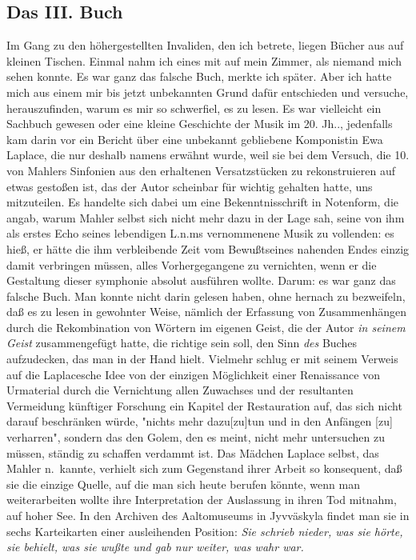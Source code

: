 \documentclass[
]{article}
\author{}
\date{\vspace{-2.5em}}
\begin{document}
\subsection{Das III. Buch}\label{das-iii.-buch}

Im Gang zu den höhergestellten Invaliden, den ich betrete, liegen Bücher
aus auf kleinen Tischen. Einmal nahm ich eines mit auf mein Zimmer, als
niemand mich sehen konnte. Es war ganz das falsche Buch, merkte ich
später. Aber ich hatte mich aus einem mir bis jetzt unbekannten Grund
dafür entschieden und versuche, herauszufinden, warum es mir so
schwerfiel, es zu lesen. Es war vielleicht ein Sachbuch gewesen oder
eine kleine Geschichte der Musik im 20. Jh.., jedenfalls kam darin vor
ein Bericht über eine unbekannt gebliebene Komponistin Ewa Laplace, die
nur deshalb namens erwähnt wurde, weil sie bei dem Versuch, die 10. von
Mahlers Sinfonien aus den erhaltenen Versatzstücken zu rekonstruieren
auf etwas gestoßen ist, das der Autor scheinbar für wichtig gehalten
hatte, uns mitzuteilen. Es handelte sich dabei um eine Bekenntnisschrift
in Notenform, die angab, warum Mahler selbst sich nicht mehr dazu in der
Lage sah, seine von ihm als erstes Echo seines lebendigen L.n.ms
vernommenene Musik zu vollenden: es hieß, er hätte die ihm verbleibende
Zeit vom Bewußtseines nahenden Endes einzig damit verbringen müssen,
alles Vorhergegangene zu vernichten, wenn er die Gestaltung dieser
symphonie absolut ausführen wollte. Darum: es war ganz das falsche Buch.
Man konnte nicht darin gelesen haben, ohne hernach zu bezweifeln, daß es
zu lesen in gewohnter Weise, nämlich der Erfassung von Zusammenhängen
durch die Rekombination von Wörtern im eigenen Geist, die der Autor
\emph{in seinem Geist} zusammengefügt hatte, die richtige sein soll, den
Sinn \emph{des} Buches aufzudecken, das man in der Hand hielt. Vielmehr
schlug er mit seinem Verweis auf die Laplacesche Idee von der einzigen
Möglichkeit einer Renaissance von Urmaterial durch die Vernichtung allen
Zuwachses und der resultanten Vermeidung künftiger Forschung ein Kapitel
der Restauration auf, das sich nicht darauf beschränken würde, "nichts
mehr dazu{[}zu{]}tun und in den Anfängen {[}zu{]} verharren", sondern
das den Golem, den es meint, nicht mehr untersuchen zu müssen, ständig
zu schaffen verdammt ist. Das Mädchen Laplace selbst, das Mahler
n.~kannte, verhielt sich zum Gegenstand ihrer Arbeit so konsequent, daß
sie die einzige Quelle, auf die man sich heute berufen könnte, wenn man
weiterarbeiten wollte ihre Interpretation der Auslassung in ihren Tod
mitnahm, auf hoher See. In den Archiven des Aaltomuseums in Jyvväskyla
findet man sie in sechs Karteikarten einer ausleihenden Position:
\emph{Sie schrieb nieder, was sie hörte, sie behielt, was sie wußte und
gab nur weiter, was wahr war.}
\end{document}
